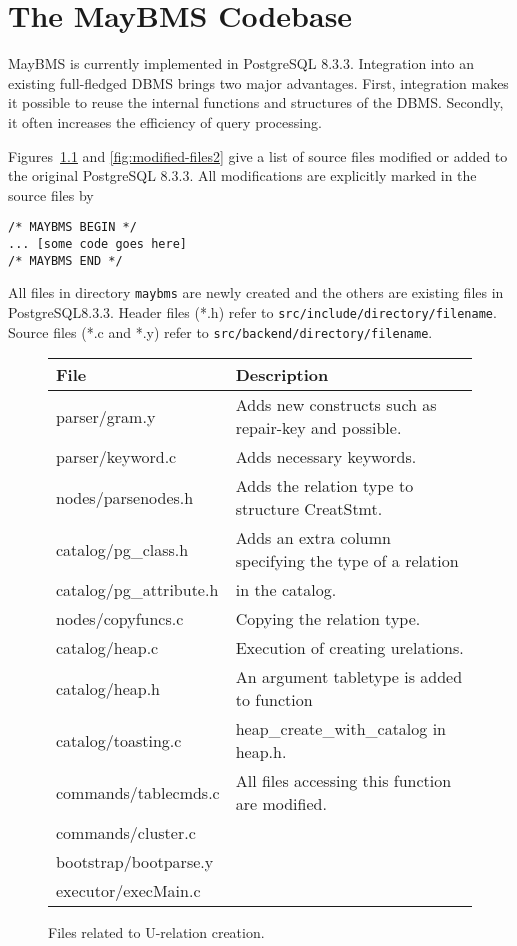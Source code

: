 

\chapter{The MayBMS Codebase}
\label{sect:codebase}

MayBMS is currently implemented in PostgreSQL 8.3.3. Integration into
an existing full-fledged DBMS brings two major advantages. First,
integration makes it possible to reuse the internal functions and
structures of the DBMS. Secondly, it often increases the efficiency of
query processing.

Figures~\ref{fig:modified-files1} and \ref{fig:modified-files2} give a
list of source files modified or added to the original PostgreSQL
8.3.3. All modifications are explicitly marked in the source files by 
\begin{verbatim}
/* MAYBMS BEGIN */
... [some code goes here]
/* MAYBMS END */
\end{verbatim}
All files in directory \texttt{maybms} are newly created and the
others are existing files in PostgreSQL8.3.3. Header files (*.h) refer
to \texttt{src/include/directory/filename}. Source files (*.c and *.y)
refer to \texttt{src/backend/directory/filename}.

\begin{figure}[ht]
\begin{center}
\small
\begin{tabular}{|l|l|}
\hline
File & Description \\
\hline
parser/gram.y           & Adds new constructs such as repair-key and possible. \\ \hline
parser/keyword.c        & Adds necessary keywords. \\ \hline
nodes/parsenodes.h      & Adds the relation type to structure CreatStmt. \\ \hline
catalog/pg\_class.h 	& Adds an extra column specifying the type of a relation \\
catalog/pg\_attribute.h & in the catalog. \\ \hline 
nodes/copyfuncs.c		& Copying the relation type. \\ \hline
catalog/heap.c          & Execution of creating urelations.  \\ \hline
catalog/heap.h			& An argument tabletype is added to function   \\ 
catalog/toasting.c		& heap\_create\_with\_catalog in heap.h.  \\ 
commands/tablecmds.c	& All files accessing this function are modified.\\
commands/cluster.c		& \\
bootstrap/bootparse.y	& \\
executor/execMain.c		& \\ \hline
\end{tabular}
\end{center}

\vspace*{-1em}
\caption{ Files related to U-relation creation.}
\label{fig:modified-files1}
\end{figure}


